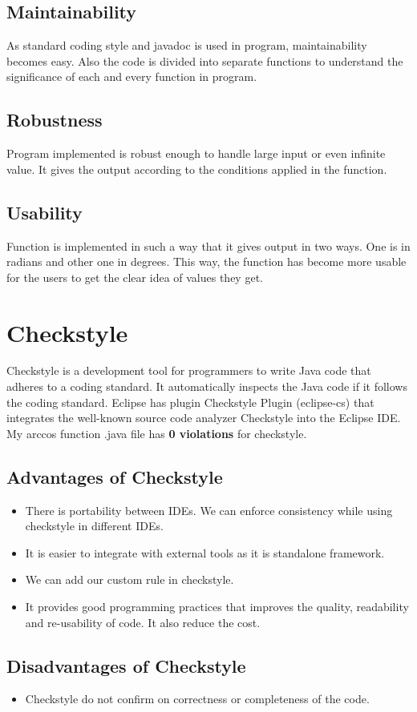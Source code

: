 \documentclass[11pt]{article}
\begin{document}
\subsection{Maintainability}
As standard coding style and javadoc is used in program, maintainability becomes easy. Also the code is divided into separate functions to understand the significance of each and every function in program.   
\subsection{Robustness}
Program implemented is robust enough to handle large input or even infinite value. It gives the output according to the conditions applied in the function.
\subsection{Usability}
Function is implemented in such a way that it gives output in two ways. One is in radians and other one in degrees. This way, the function has become more usable for the users to get the clear idea of values they get.
\section{Checkstyle}
Checkstyle is a development tool for programmers to write Java code that adheres to a coding standard. It automatically inspects the Java code if it follows the coding standard. Eclipse has plugin Checkstyle Plugin (eclipse-cs) that integrates the well-known source code analyzer Checkstyle into the Eclipse IDE. \\
My arccos function .java file has \textbf{0 violations} for checkstyle.
\subsection{Advantages of Checkstyle }
\begin{itemize}
\item There is portability between IDEs. We can enforce consistency while using checkstyle in different IDEs.
\item It is easier to integrate with external tools as it is standalone framework.
\item We can add our custom rule in checkstyle.
\item It provides good programming practices that improves the quality, readability and re-usability of code. It also reduce the cost.
\end{itemize} 
\subsection{Disadvantages of Checkstyle}
\begin{itemize}
\item Checkstyle do not confirm on correctness or completeness of the code.
\end{itemize} 
\end{document}
